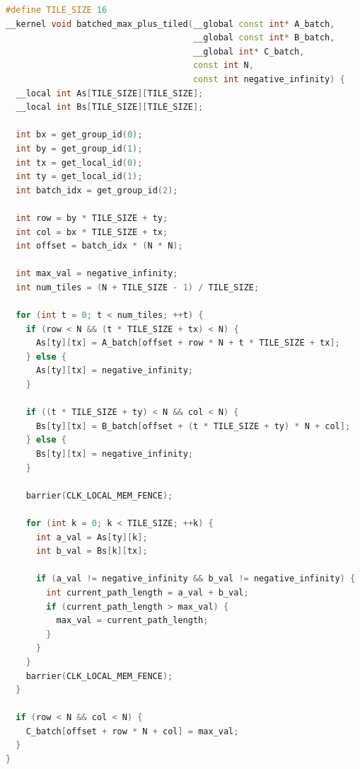 \begin{algfloat}[htbp]
\begin{lstlisting}[language=C++]
#define TILE_SIZE 16
__kernel void batched_max_plus_tiled(__global const int* A_batch,
                                     __global const int* B_batch,
                                     __global int* C_batch,
                                     const int N,
                                     const int negative_infinity) {
  __local int As[TILE_SIZE][TILE_SIZE];
  __local int Bs[TILE_SIZE][TILE_SIZE];

  int bx = get_group_id(0);
  int by = get_group_id(1);
  int tx = get_local_id(0);
  int ty = get_local_id(1);
  int batch_idx = get_group_id(2);

  int row = by * TILE_SIZE + ty;
  int col = bx * TILE_SIZE + tx;
  int offset = batch_idx * (N * N);

  int max_val = negative_infinity;
  int num_tiles = (N + TILE_SIZE - 1) / TILE_SIZE;

  for (int t = 0; t < num_tiles; ++t) {
    if (row < N && (t * TILE_SIZE + tx) < N) {
      As[ty][tx] = A_batch[offset + row * N + t * TILE_SIZE + tx];
    } else {
      As[ty][tx] = negative_infinity;
    }

    if ((t * TILE_SIZE + ty) < N && col < N) {
      Bs[ty][tx] = B_batch[offset + (t * TILE_SIZE + ty) * N + col];
    } else {
      Bs[ty][tx] = negative_infinity;
    }

    barrier(CLK_LOCAL_MEM_FENCE);

    for (int k = 0; k < TILE_SIZE; ++k) {
      int a_val = As[ty][k];
      int b_val = Bs[k][tx];

      if (a_val != negative_infinity && b_val != negative_infinity) {
        int current_path_length = a_val + b_val;
        if (current_path_length > max_val) {
          max_val = current_path_length;
        }
      }
    }
    barrier(CLK_LOCAL_MEM_FENCE);
  }

  if (row < N && col < N) {
    C_batch[offset + row * N + col] = max_val;
  }
}
\end{lstlisting}
  \caption{Tiled GPU kernel for computing batches of matrix multiplications}
  \label{alg:gpu-kernel}
\end{algfloat}
